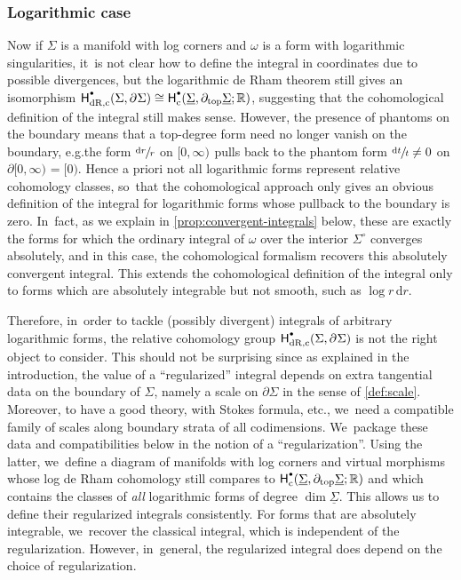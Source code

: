 \documentclass[10pt]{amsart}
\let\oldbullet\bullet
\renewcommand{\bullet}{{\raisebox{1pt}{$\scriptscriptstyle\oldbullet$}}}
\newcommand{\dslog}[1]{\sfrac{\dd#1}{#1}}
\theoremstyle{definition}
\theoremstyle{remark}
\newcommand{\RR}{\mathbb{R}}
\newcommand{\halfspc}[1]{[0,\infty)^{#1}}
\newcommand{\dd}{\mathrm{d}}
\newcommand{\Sig}{\Sigma}
\newcommand{\uSig}{\underline{\Sigma}}
\newcommand{\bdSig}[1][]{\partial^{#1}\Sigma}
\newcommand{\intSig}{\Sigma^\circ}
\newcommand{\HdRc}[2][\bullet]{\mathsf{H}_{\mathrm{dR},\mathrm{c}}^{#1}(#2)}
\providecommand{\eg}{e.g.}\providecommand{\ie}{i.e.}
\begin{document}
\subsubsection{Logarithmic case}
Now if $\Sig$ is a manifold with log corners and $\omega$ is a form with logarithmic singularities, it~is not clear how to define the integral in coordinates due to possible divergences, but the logarithmic de Rham theorem still gives an isomorphism $\HdRc{\Sig,\bdSig} \cong \mathsf{H}^\bullet_{\mathrm{c}}(\uSig,\partial_{\mathrm{top}}\uSig;\RR)$, suggesting that the cohomological definition of the integral still makes sense. However, the presence of phantoms on the boundary means that a top-degree form need no longer vanish on the boundary, \eg the form $\dslog{r}$ on $\halfspc{}$ pulls back to the phantom form $\dslog{t}\neq 0$ on $\partial\halfspc{} = [0)$. Hence a priori not all logarithmic forms represent relative cohomology classes, so~that the cohomological approach only gives an obvious definition of the integral for logarithmic forms whose pullback to the boundary is zero. In~fact, as we explain in \autoref{prop:convergent-integrals} below, these are exactly the forms for which the ordinary integral of $\omega$ over the interior $\intSig$ converges absolutely, and in this case, the cohomological formalism recovers this absolutely convergent integral. This extends the cohomological definition of the integral only to forms which are absolutely integrable but not smooth, such as $\log r\, \dd r$.

Therefore, in~order to tackle (possibly divergent) integrals of arbitrary logarithmic forms, the relative cohomology group $\HdRc{\Sig,\bdSig}$ is not the right object to consider. This should not be surprising since as explained in the introduction, the value of a ``regularized'' integral depends on extra tangential data on the boundary of $\Sig$, namely a scale on $\partial\Sigma$ in the sense of \autoref{def:scale}.
Moreover, to have a good theory, with Stokes formula, etc., we~need a compatible family of scales along boundary strata of all codimensions. We~package these data and compatibilities below in the notion of a ``regularization''. Using the latter, we~define a diagram of manifolds with log corners and virtual morphisms whose log de Rham cohomology still compares to $\mathsf{H}^\bullet_{\mathrm{c}}(\uSig,\partial_{\mathrm{top}}\uSig;\RR)$ and which contains the classes of \emph{all} logarithmic forms of degree $\dim \uSig$. This allows us to define their regularized integrals consistently. For forms that are absolutely integrable, we~recover the classical integral, which is independent of the regularization. However, in~general, the regularized integral does depend on the choice of regularization.
\end{document}

